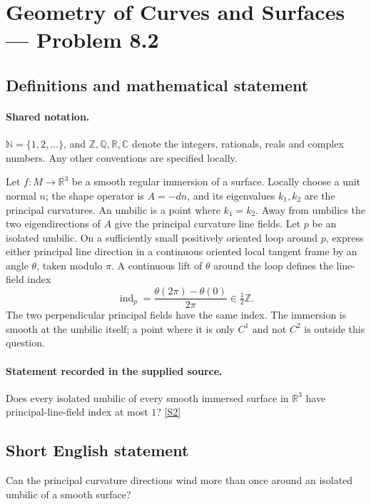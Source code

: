 \documentclass[11pt]{article}
\newcommand{\sref}[2]{\hyperlink{source:#1:#2}{[S#2]}}
\begin{document}
\section{Geometry of Curves and Surfaces — Problem 8.2}\label{statement}

\subsection{Definitions and mathematical statement}

\paragraph{Shared notation.}$\mathbb N=\{1,2,\ldots\}$, and $\mathbb Z,\mathbb Q,\mathbb R,\mathbb C$ denote the integers, rationals, reals and complex numbers. Any other conventions are specified locally.


Let $f:M\to\mathbb R^3$ be a smooth regular immersion of a surface. Locally choose a unit normal $n$; the shape operator is $A=-dn$, and its eigenvalues $k_1,k_2$ are the principal curvatures. An umbilic is a point where $k_1=k_2$. Away from umbilics the two eigendirections of $A$ give the principal curvature line fields. Let $p$ be an isolated umbilic. On a sufficiently small positively oriented loop around $p$, express either principal line direction in a continuous oriented local tangent frame by an angle $\theta$, taken modulo $\pi$. A continuous lift of $\theta$ around the loop defines the line-field index
\[\operatorname{ind}_p=\frac{\theta(2\pi)-\theta(0)}{2\pi}\in\tfrac12\mathbb Z.\]
The two perpendicular principal fields have the same index. The immersion is smooth at the umbilic itself; a point where it is only $C^1$ and not $C^2$ is outside this question.
\paragraph{Statement recorded in the supplied source.}
Does every isolated umbilic of every smooth immersed surface in $\mathbb R^3$ have principal-line-field index at most $1$? \sref{statement}{2}
\subsection{Short English statement}
Can the principal curvature directions wind more than once around an isolated umbilic of a smooth surface?
\end{document}
